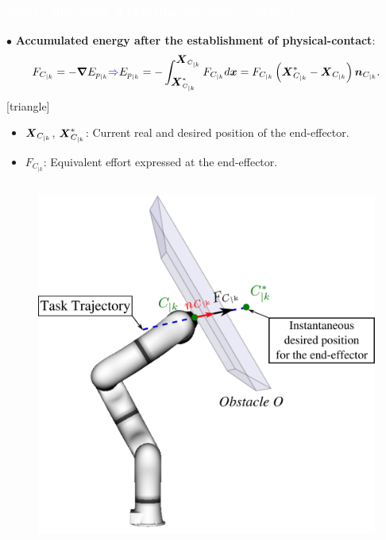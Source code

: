 \begin{frame}
\frametitle{{\textcolor{white}{\hspace{0.2cm}Safety indicator 2 (During physical-contact)}}}
\vspace{-15mm}
\hspace{-5mm}
$\bullet$ \textbf{{\color{blue}Accumulated energy} after the establishment of {\color{red}physical-contact}}: 
\vspace{-1mm}
\begin{equation}
F_{C_{|k}} = -\mbox{\boldmath${\nabla}$} E_{p_{|k}} {\color{blue}\Rightarrow} E_{p_{|k}} = -\int_{\mbox{\boldmath${X}$}_{C_{|k}}^{*}}^{\mbox{\boldmath${X}$}_{C_{|k}}} F_{C_{|k}} d\mbox{\boldmath${x}$} = F_{C_{|k}} \left(\mbox{\boldmath${X}$}_{C_{|k}}^{*} - \mbox{\boldmath${X}$}_{C_{|k}}\right) \mbox{\boldmath${n}$}_{C_{|k}}.
\label{eq:Ep_is_force_int}
\end{equation}
\vspace{-5mm}
[triangle]  
\begin{itemize}
\addtolength{\itemindent}{2mm}
\item $\mbox{\boldmath${X}$}_{C_{|k}}$, $\mbox{\boldmath${X}$}_{C_{|k}}^{*}$: Current real and desired position of the end-effector.
\setlength\itemsep{-0.5em}
\item $F_{C_{|k}}$: Equivalent effort expressed at the end-effector.
\end{itemize}
\begin{columns}

\vspace{-7mm}
\begin{figure}
\includegraphics[width=1.2\linewidth]{figures/obstacle_nobackground2}
\end{figure}


\end{columns}
\end{frame}

